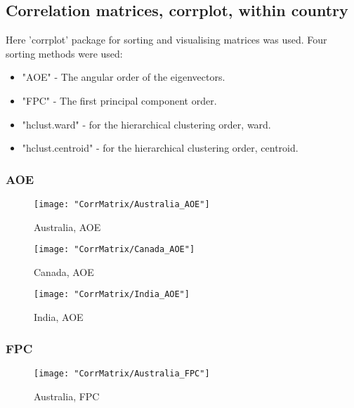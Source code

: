 \documentclass[a4paper]{article}
\begin{document}
\subsection{Correlation matrices, corrplot, within country}
Here 'corrplot' package for sorting and visualising matrices was
used. Four sorting methods were used:
\begin{itemize}
\item "AOE" -  The angular order of the eigenvectors.
\item "FPC" - The first principal component order.
\item "hclust.ward" - for the hierarchical clustering order, ward.
\item "hclust.centroid" - for the hierarchical clustering order, centroid.
\end{itemize}

\subsubsection{AOE}

\begin{figure}[H]
\begin{center}
\texttt{[image: "CorrMatrix/Australia\_AOE"]}
\caption{Australia,  AOE}
\label{fig:2}
\end{center}
\end{figure}

\begin{figure}[H]
\begin{center}
\texttt{[image: "CorrMatrix/Canada\_AOE"]}
\caption{Canada,  AOE}
\label{fig:2}
\end{center}
\end{figure}

\begin{figure}[H]
\begin{center}
\texttt{[image: "CorrMatrix/India\_AOE"]}
\caption{India,  AOE}
\label{fig:2}
\end{center}
\end{figure}

\subsubsection{FPC}

\begin{figure}[H]
\begin{center}
\texttt{[image: "CorrMatrix/Australia\_FPC"]}
\caption{Australia,  FPC}
\label{fig:2}
\end{center}
\end{figure}
\end{document}
